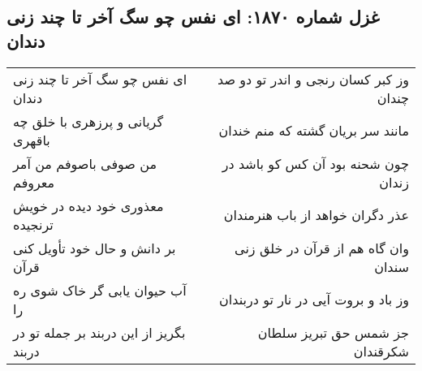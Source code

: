 \begin{center}
\section*{غزل شماره ۱۸۷۰: ای نفس چو سگ آخر تا چند زنی دندان}
\label{sec:1870}
\begin{longtable}{l p{0.5cm} r}
ای نفس چو سگ آخر تا چند زنی دندان
&&
وز کبر کسان رنجی و اندر تو دو صد چندان
\\
گریانی و پرزهری با خلق چه باقهری
&&
مانند سر بریان گشته که منم خندان
\\
من صوفی باصوفم من آمر معروفم
&&
چون شحنه بود آن کس کو باشد در زندان
\\
معذوری خود دیده در خویش ترنجیده
&&
عذر دگران خواهد از باب هنرمندان
\\
بر دانش و حال خود تأویل کنی قرآن
&&
وان گاه هم از قرآن در خلق زنی سندان
\\
آب حیوان یابی گر خاک شوی ره را
&&
وز باد و بروت آیی در نار تو دربندان
\\
بگریز از این دربند بر جمله تو در دربند
&&
جز شمس حق تبریز سلطان شکرقندان
\\
\end{longtable}
\end{center}
